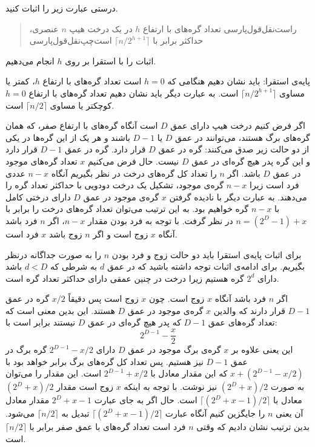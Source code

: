  درستی عبارت زیر را اثبات کنید.
\begin{quote}
‌راست‌نقل‌قول‌پارسی تعداد گره‌های با ارتفاع {$h$} در یک درخت هیپ {$n$} عنصری، حداکثر برابر با {$\lceil n/2^{h+1}\rceil$} است‌چپ‌نقل‌قول‌پارسی
\end{quote}


اثبات را با استقرا بر روی {$h$} انجام می‌دهیم.

پایه‌ی استقرا: باید نشان دهیم هنگامی که {$h=0$} است تعداد گره‌های با ارتفاع {$h$}، کمتر یا مساوی {$\lceil n/2^{h+1}\rceil$} است. به عبارت دیگر باید نشان دهیم تعداد گره‌های با ارتفاع {$h=0$} کوچکتر یا مساوی {$\lceil n/2\rceil$} است.

اگر فرض کنیم درخت هیپ دارای عمق {$D$} است آنگاه گره‌های با ارتفاع صفر، که همان گره‌های برگ هستند، می‌توانند در عمق {$D$} یا {$D-1$} باشند و هر یک از این گره‌ها در یکی از دو حالت زیر صدق می‌کنند:
 گره‌‌ در عمق {$D$} قرار دارد.
 گره‌ در عمق {$D-1$} قرار دارد و این گره پدر هیچ گره‌ای در عمق {$D$} نیست.
حال فرض می‌کنیم {$x$}  تعداد گره‌های موجود در عمق {$D$} باشد. اگر {$n$} را تعداد کل گره‌های درخت در نظر بگیریم آنگاه {$n-x$} عددی فرد است زیرا {$n-x$} گره‌ی موجود، تشکیل یک درخت دودویی با حداکثر تعداد گره را می‌دهند. به عبارت دیگر با نادیده گرفتن {$x$} گره‌ی موجود در عمق {$D$} دارای درختی کامل با {$n-x$} گره خواهیم بود. به این ترتیب می‌توان تعداد گره‌ها‌ی درخت را برابر با {$n=(2^{D}-1)+x$} در نظر گرفت. با توجه به فرد بودن مقدار {$n-x$}، اگر {$n$} فرد باشد آنگاه {$x$} زوج است و اگر {$n$} زوج باشد {$x$} فرد است.

برای اثبات پایه‌ی استقرا باید دو حالت زوج و فرد بودن {$n$} را به صورت جداگانه درنظر بگیریم. برای ادامه‌ی اثبات توجه داشته باشید که در عمق {$d$} به شرطی که {$d<D$} باشد دارای {$2^d$} گره هستیم زیرا درخت در چنین عمقی دارای حداکثر تعداد گره است.

اگر {$n$} فرد باشد آنگاه {$x$} زوج است. چون {$x$} زوج است پس دقیقاً {$x/2$} گره در عمق {$D-1$} قرار دارند که والدین {$x$} گره‌ی موجود در عمق {$D$} هستند. این بدین معنی است که تعداد گره‌های عمق {$D-1$} که پدر هیچ گره‌ای در عمق {$D$} نیستند برابر است با:
\begin{equation}
2^{D-1}-\frac{x}{2}
\end{equation}
این یعنی علاوه بر {$x$} گره‌ی برگ موجود در عمق {$D$} دارای {$2^{D-1}-x/2$} گره برگ در عمق {$D-1$} نیز هستیم. پس تعداد کل گره‌های برگ برابر خواهد بود با {$x+(2^{D-1}-x/2)$} که این مقدار معادل با {$2^{D-1}+x/2$} است. این مقدار را می‌توان به صورت {$(2^D+x)/2$} نیز نوشت. با توجه به اینکه {$x$} زوج است مقدار {$(2^D+x)/2$} معادل با {$\lceil (2^D+x-1)/2\rceil$} است. حال اگر به جای عبارت {$2^D+x-1$} مقدار معادل آن یعنی {$n$} را جایگزین کنیم آنگاه عبارت {$\lceil (2^D+x-1)/2\rceil$} تبدیل به {$\lceil n/2\rceil$} می‌شود. بدین ترتیب نشان دادیم که وقتی {$n$} فرد است تعداد گره‌های با عمق صفر برابر با {$\lceil n/2\rceil$} است.

